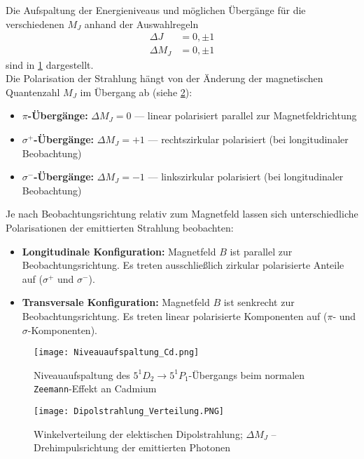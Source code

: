 Die Aufspaltung der Energieniveaus und möglichen Übergänge für die verschiedenen $M_J$ anhand der Auswahlregeln
\begin{align*}
    \Delta J &= 0, \pm 1\\
    \Delta M_J &= 0, \pm 1
\end{align*}
sind in \cref{fig:cd_niveaus} dargestellt.
\vspace{0.3cm}\\
Die Polarisation der Strahlung hängt von der Änderung der magnetischen Quantenzahl $M_J$ im Übergang ab (siehe \cref{fig:polarisation}):
\begin{itemize}
    \item \textbf{$\pi$-Übergänge:} $\Delta M_J = 0$ — linear polarisiert parallel zur Magnetfeldrichtung
    \item \textbf{$\sigma^+$-Übergänge:} $\Delta M_J = +1$ — rechtszirkular polarisiert (bei longitudinaler Beobachtung)
    \item \textbf{$\sigma^-$-Übergänge:} $\Delta M_J = -1$ — linkszirkular polarisiert (bei longitudinaler Beobachtung)
\end{itemize}
Je nach Beobachtungsrichtung relativ zum Magnetfeld lassen sich unterschiedliche Polarisationen der emittierten Strahlung beobachten:
\begin{itemize}
    \item \textbf{Longitudinale Konfiguration:} Magnetfeld $B$ ist parallel zur Beobachtungsrichtung. Es treten ausschließlich zirkular polarisierte Anteile auf ($\sigma^+$ und $\sigma^-$).
    \item \textbf{Transversale Konfiguration:} Magnetfeld $B$ ist senkrecht zur Beobachtungsrichtung. Es treten linear polarisierte Komponenten auf ($\pi$- und $\sigma$-Komponenten).
\end{itemize}
\begin{figure}[ht]
    \centering
    \texttt{[image: Niveauaufspaltung\_Cd.png]}
    \caption[Niveauaufspaltung des$5^1D_2 \rightarrow 5^1P_1$-Übergangs bei Cd]{Niveauaufspaltung des $5^1D_2 \rightarrow 5^1P_1$-Übergangs beim normalen \texttt{Zeemann}-Effekt an Cadmium~\cite{LD}}\label{fig:cd_niveaus}
\end{figure}
\begin{figure}[!ht]
    \centering
    \texttt{[image: Dipolstrahlung\_Verteilung.PNG]}
    \caption[Winkelverteilung der elektischen Dipolstrahlung]{Winkelverteilung der elektischen Dipolstrahlung; $\Delta M_J$ -- Drehimpulsrichtung der emittierten Photonen~\cite{LD}}\label{fig:polarisation} %
\end{figure}
%
%
